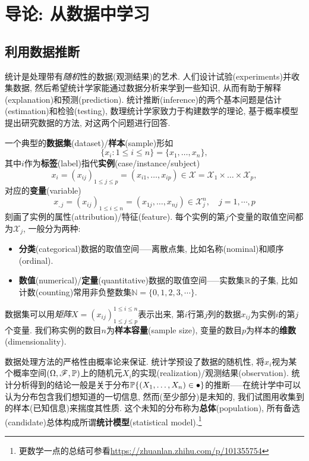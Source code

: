 \chapter{导论: 从数据中学习}\label{chap:intro}
\section{利用数据推断}\label{intro-inference}

统计是处理带有\emph{随机}性的数据(观测结果)的艺术. 人们设计试验(experiments)并收集数据, 然后希望统计学家能通过数据分析来学到一些知识, 从而有助于解释(explanation)和预测(prediction). 统计推断(inference)的两个基本问题是估计(estimation)和检验(testing), 数理统计学家致力于构建数学的理论, 基于概率模型提出研究数据的方法, 对这两个问题进行回答.

一个典型的\textbf{数据集}(dataset)/\textbf{样本}(sample)形如
\[ \{x_{i} : 1\leq i\leq n\} = \{x_{1},\dots,x_{n}\}, \]
其中$i$作为\textbf{标签}(label)指代\textbf{实例}(case/instance/subject)
\[ x_{i} = (x_{ij})_{1\leq j\leq p} = (x_{i1},\dots,x_{ip}) \in \mathcal{X} = \mathcal{X}_{1}\times\dots\times\mathcal{X}_{p}, \]
对应的\textbf{变量}(variable)
\[ x_{,j} = (x_{ij})_{1\leq i\leq n} = (x_{1j},\dots,x_{nj}) \in \mathcal{X}_{j}^{n}, \quad j=1,\cdots,p \]
刻画了实例的属性(attribution)/特征(feature).
每个实例的第$j$个变量的取值空间都为$\mathcal{X}_{j}$, 一般分为两种:
\begin{itemize}
    \item \textbf{分类}(categorical)数据的取值空间-----离散点集, 比如名称(nominal)和顺序(ordinal).
    \item \textbf{数值}(numerical)/\textbf{定量}(quantitative)数据的取值空间-----实数集$\R$的子集, 比如计数(counting)常用非负整数集$\mathbb{N} = \{0,1,2,3,\cdots\}$.
\end{itemize}
数据集可以用\emph{矩阵}$X=(x_{ij})^{1\leq i\leq n}_{1\leq j\leq p}$表示出来, 第$i$行第$j$列的数据$x_{ij}$为实例$i$的第$j$个变量.
我们称实例的数目$n$为\textbf{样本容量}(sample size), 变量的数目$p$为样本的\textbf{维数}(dimensionality).

数据处理方法的严格性由概率论来保证. 统计学预设了数据的随机性, 将$x_{i}$视为某个概率空间$(\Omega,\mathscr{F},\P)$上的随机元$X_{i}$的实现(realization)/观测结果(observation). 统计分析得到的结论一般是关于分布$\P\{(X_{1},\dots,X_{n})\in\bullet\}$的推断-----在统计学中可以认为分布包含我们想知道的一切信息, 然而(至少部分)是未知的, 我们试图用收集到的样本(已知信息)来揣度其性质. 这个未知的分布称为\textbf{总体}(population), 所有备选(candidate)总体构成所谓\textbf{统计模型}(statistical model).\footnote{更数学一点的总结可参看\url{https://zhuanlan.zhihu.com/p/101355754}}


